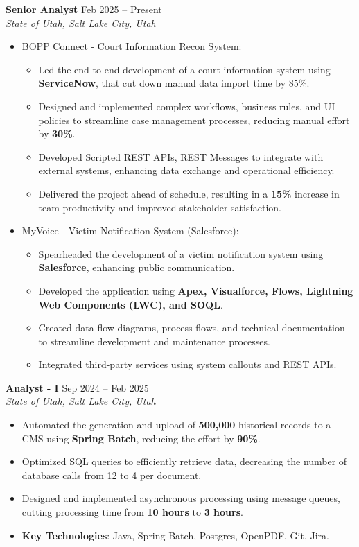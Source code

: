 \documentclass[letterpaper,10pt]{article}
\begin{document}
\textbf{Senior Analyst} \hfill Feb 2025 -- Present\\
\textit{State of Utah, Salt Lake City, Utah}
\begin{itemize}
  \item BOPP Connect - Court Information Recon System:
    \begin{itemize}
      \item Led the end-to-end development of a court information system using \textbf{ServiceNow}, that cut down manual data import time by 85\%.
      \item Designed and implemented complex workflows, business rules, and UI policies to streamline case management processes, reducing manual effort by \textbf{30\%}.
      \item Developed Scripted REST APIs, REST Messages to integrate with external systems, enhancing data exchange and operational efficiency.
      \item Delivered the project ahead of schedule, resulting in a \textbf{15\%} increase in team productivity and improved stakeholder satisfaction.
    \end{itemize}
  \item MyVoice - Victim Notification System (Salesforce):
    \begin{itemize}
      \item Spearheaded the development of a victim notification system using \textbf{Salesforce}, enhancing public communication.
      \item Developed the application using \textbf{Apex, Visualforce, Flows, Lightning Web Components (LWC), and SOQL}.
      \item Created data-flow diagrams, process flows, and technical documentation to streamline development and maintenance processes.
      \item Integrated third-party services using system callouts and REST APIs.
    \end{itemize}
\end{itemize}

\vspace{2pt}
\textbf{Analyst - I} \hfill Sep 2024 -- Feb 2025\\
\textit{State of Utah, Salt Lake City, Utah}
\begin{itemize}
  \item Automated the generation and upload of \textbf{500,000} historical records to a CMS using \textbf{Spring Batch}, reducing the effort by \textbf{90\%}.
  \item Optimized SQL queries to efficiently retrieve data, decreasing the number of database calls from 12 to 4 per document.
  \item Designed and implemented asynchronous processing using message queues, cutting processing time from \textbf{10 hours} to \textbf{3 hours}.
  \item \textbf{Key Technologies}: Java, Spring Batch, Postgres, OpenPDF, Git, Jira.
\end{itemize}
\end{document}
